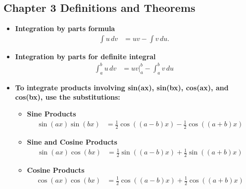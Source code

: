 \documentclass{report}
\begin{document}
    \subsection{Chapter 3 Definitions and Theorems}
    \bigbreak \noindent 
    \begin{itemize}
        \item \textbf{Integration by parts formula} 
            \begin{align*}
                \int u \, dv &= uv - \int v \, du 
            .\end{align*}
        \item \textbf{Integration by parts for definite integral}
            \begin{align*}
                \int_{a}^{b} u \, dv &= uv\big|_{a}^{b} - \int_{a}^{b} v \, du
            \end{align*}
        \item \textbf{To integrate products involving  sin(ax), sin(bx), cos(ax), and  cos(bx), use the substitutions:}
            \begin{itemize}
                \item \textbf{Sine Products}
                    \begin{align*}
                        \sin(ax) \sin(bx) &= \frac{1}{2} \cos((a-b)x) - \frac{1}{2} \cos((a+b)x)
                    \end{align*}

                \item \textbf{Sine and Cosine Products}
                    \begin{align*}
                        \sin(ax) \cos(bx) &= \frac{1}{2} \sin((a-b)x) + \frac{1}{2} \sin((a+b)x)
                    \end{align*}

                \item \textbf{Cosine Products}
                    \begin{align*}
                        \cos(ax) \cos(bx) &= \frac{1}{2} \cos((a-b)x) + \frac{1}{2} \cos((a+b)x)
                    \end{align*}


\end{itemize}
\end{itemize}
\end{document}
